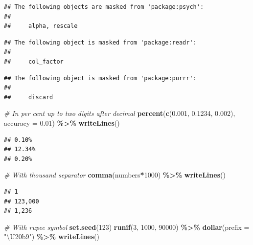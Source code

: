 \documentclass[
]{book}
\newenvironment{Shaded}{\begin{snugshade}}{\end{snugshade}}
\newcommand{\AttributeTok}[1]{\textcolor[rgb]{0.13,0.29,0.53}{#1}}
\newcommand{\CommentTok}[1]{\textcolor[rgb]{0.56,0.35,0.01}{\textit{#1}}}
\newcommand{\DecValTok}[1]{\textcolor[rgb]{0.00,0.00,0.81}{#1}}
\newcommand{\FloatTok}[1]{\textcolor[rgb]{0.00,0.00,0.81}{#1}}
\newcommand{\FunctionTok}[1]{\textcolor[rgb]{0.13,0.29,0.53}{\textbf{#1}}}
\newcommand{\NormalTok}[1]{#1}
\newcommand{\SpecialCharTok}[1]{\textcolor[rgb]{0.81,0.36,0.00}{\textbf{#1}}}
\newcommand{\StringTok}[1]{\textcolor[rgb]{0.31,0.60,0.02}{#1}}
\begin{document}
\begin{verbatim}
## The following objects are masked from 'package:psych':
## 
##     alpha, rescale
\end{verbatim}

\begin{verbatim}
## The following object is masked from 'package:readr':
## 
##     col_factor
\end{verbatim}

\begin{verbatim}
## The following object is masked from 'package:purrr':
## 
##     discard
\end{verbatim}

\begin{Shaded}
\begin{Highlighting}[]
\CommentTok{\# In per cent up to two digits after decimal}
\FunctionTok{percent}\NormalTok{(}\FunctionTok{c}\NormalTok{(}\FloatTok{0.001}\NormalTok{, }\FloatTok{0.1234}\NormalTok{, }\FloatTok{0.002}\NormalTok{), }\AttributeTok{accuracy =} \FloatTok{0.01}\NormalTok{) }\SpecialCharTok{\%\textgreater{}\%} 
  \FunctionTok{writeLines}\NormalTok{()}
\end{Highlighting}
\end{Shaded}

\begin{verbatim}
## 0.10%
## 12.34%
## 0.20%
\end{verbatim}

\begin{Shaded}
\begin{Highlighting}[]
\CommentTok{\# With thousand separator}
\FunctionTok{comma}\NormalTok{(numbers}\SpecialCharTok{*}\DecValTok{1000}\NormalTok{) }\SpecialCharTok{\%\textgreater{}\%} 
  \FunctionTok{writeLines}\NormalTok{()}
\end{Highlighting}
\end{Shaded}

\begin{verbatim}
## 1
## 123,000
## 1,236
\end{verbatim}

\begin{Shaded}
\begin{Highlighting}[]
\CommentTok{\# With rupee symbol}
\FunctionTok{set.seed}\NormalTok{(}\DecValTok{123}\NormalTok{)}
\FunctionTok{runif}\NormalTok{(}\DecValTok{3}\NormalTok{, }\DecValTok{1000}\NormalTok{, }\DecValTok{90000}\NormalTok{) }\SpecialCharTok{\%\textgreater{}\%} 
  \FunctionTok{dollar}\NormalTok{(}\AttributeTok{prefix =} \StringTok{"\textbackslash{}U20b9"}\NormalTok{) }\SpecialCharTok{\%\textgreater{}\%} 
  \FunctionTok{writeLines}\NormalTok{()}
\end{Highlighting}
\end{Shaded}
\end{document}
